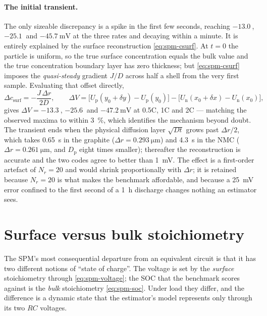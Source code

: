 \paragraph{The initial transient.} The only sizeable discrepancy is a spike in the first few
seconds, reaching $-\SI{13.0}{}$, $-\SI{25.1}{}$ and $-\SI{45.7}{\milli\volt}$ at the three rates
and decaying within a minute. It is entirely explained by the surface reconstruction
\eqref{eq:spm-csurf}. At $t=0$ the particle is uniform, so the true surface concentration equals
the bulk value and the true concentration boundary layer has zero thickness; but
\eqref{eq:spm-csurf} imposes the \emph{quasi-steady} gradient $J/D$ across half a shell from the
very first sample. Evaluating that offset directly,
\begin{equation}
\Delta c_{\mathrm{surf}} = -\frac{J\,\Delta r}{2D},
\qquad
\Delta V = \big[U_{\mathrm{p}}(y_0+\delta y) - U_{\mathrm{p}}(y_0)\big]
 - \big[U_{\mathrm{n}}(x_0+\delta x) - U_{\mathrm{n}}(x_0)\big],
\label{eq:spm-initoffset}
\end{equation}
gives $\Delta V = -\SI{13.3}{}$, $-\SI{25.6}{}$ and $-\SI{47.2}{\milli\volt}$ at 0.5C, 1C and 2C
--- matching the observed maxima to within \SI{3}{\percent}, which identifies the mechanism
beyond doubt. The transient ends when the physical diffusion layer $\sqrt{Dt}$ grows past
$\Delta r/2$, which takes \SI{0.65}{\second} in the graphite ($\Delta r = \SI{0.293}{\micro\metre}$)
and \SI{4.3}{\second} in the NMC ($\Delta r = \SI{0.261}{\micro\metre}$, and $D_{\mathrm{p}}$
eight times smaller); thereafter the reconstruction is accurate and the two codes agree to better
than \SI{1}{\milli\volt}. The effect is a first-order artefact of $N_r=20$ and would shrink
proportionally with $\Delta r$; it is retained because $N_r=20$ is what makes the benchmark
affordable, and because a \SI{25}{\milli\volt} error confined to the first second of a
\SI{1}{\hour} discharge changes nothing an estimator sees.

\section{Surface versus bulk stoichiometry}
\label{sec:spm-surface}

The SPM's most consequential departure from an equivalent circuit is that it has two different
notions of ``state of charge''. The voltage is set by the \emph{surface} stoichiometry through
\eqref{eq:spm-voltage}; the SOC that the benchmark scores against is the \emph{bulk}
stoichiometry \eqref{eq:spm-soc}. Under load they differ, and the difference is a dynamic state
that the estimator's model represents only through its two $RC$ voltages.

